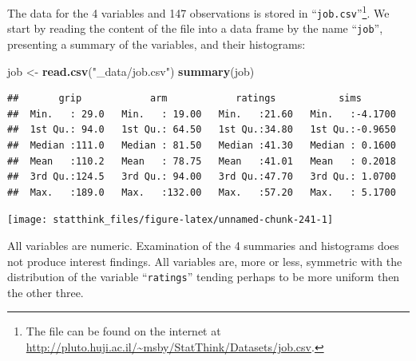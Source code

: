 \documentclass[
]{krantz}
\makeatletter
\newenvironment{Shaded}{\begin{snugshade}}{\end{snugshade}}
\newcommand{\CommentTok}[1]{\textcolor[rgb]{0.56,0.35,0.01}{\textit{#1}}}
\newcommand{\DataTypeTok}[1]{\textcolor[rgb]{0.13,0.29,0.53}{#1}}
\newcommand{\DecValTok}[1]{\textcolor[rgb]{0.00,0.00,0.81}{#1}}
\newcommand{\KeywordTok}[1]{\textcolor[rgb]{0.13,0.29,0.53}{\textbf{#1}}}
\newcommand{\NormalTok}[1]{#1}
\newcommand{\OperatorTok}[1]{\textcolor[rgb]{0.81,0.36,0.00}{\textbf{#1}}}
\newcommand{\StringTok}[1]{\textcolor[rgb]{0.31,0.60,0.02}{#1}}
\newenvironment{kframe}{%
\medskip{}
\setlength{\fboxsep}{.8em}
 \def\at@end@of@kframe{}%
 \ifinner\ifhmode%
  \def\at@end@of@kframe{\end{minipage}}%
  \begin{minipage}{\columnwidth}%
 \fi\fi%
 \def\FrameCommand##1{\hskip\@totalleftmargin \hskip-\fboxsep
 \colorbox{shadecolor}{##1}\hskip-\fboxsep
     \hskip-\linewidth \hskip-\@totalleftmargin \hskip\columnwidth}%
 \MakeFramed {\advance\hsize-\width
   \@totalleftmargin\z@ \linewidth\hsize
   \@setminipage}}%
 {\par\unskip\endMakeFramed%
 \at@end@of@kframe}
\renewenvironment{Shaded}{\begin{kframe}}{\end{kframe}}
\theoremstyle{definition}
\theoremstyle{definition}
\theoremstyle{definition}
\theoremstyle{remark}
\makeatother
\begin{document}
The data for the 4 variables and 147 observations is stored in
``\texttt{job.csv}''\footnote{The file can be found on the internet at
  \url{http://pluto.huji.ac.il/~msby/StatThink/Datasets/job.csv}.}. We start by reading the content of the file into a data
frame by the name ``\texttt{job}'', presenting a summary of the variables, and
their histograms:

\begin{Shaded}
\begin{Highlighting}[]
\NormalTok{job <-}\StringTok{ }\KeywordTok{read.csv}\NormalTok{(}\StringTok{"_data/job.csv"}\NormalTok{)}
\KeywordTok{summary}\NormalTok{(job)}
\end{Highlighting}
\end{Shaded}

\begin{verbatim}
##       grip            arm            ratings           sims        
##  Min.   : 29.0   Min.   : 19.00   Min.   :21.60   Min.   :-4.1700  
##  1st Qu.: 94.0   1st Qu.: 64.50   1st Qu.:34.80   1st Qu.:-0.9650  
##  Median :111.0   Median : 81.50   Median :41.30   Median : 0.1600  
##  Mean   :110.2   Mean   : 78.75   Mean   :41.01   Mean   : 0.2018  
##  3rd Qu.:124.5   3rd Qu.: 94.00   3rd Qu.:47.70   3rd Qu.: 1.0700  
##  Max.   :189.0   Max.   :132.00   Max.   :57.20   Max.   : 5.1700
\end{verbatim}

\begin{Shaded}
\end{Shaded}

\begin{center}\texttt{[image: statthink\_files/figure-latex/unnamed-chunk-241-1]} \end{center}

All variables are numeric. Examination of the 4 summaries and
histograms does not produce interest findings. All variables are, more
or less, symmetric with the distribution of the variable ``\texttt{ratings}''
tending perhaps to be more uniform then the other three.
\end{document}
